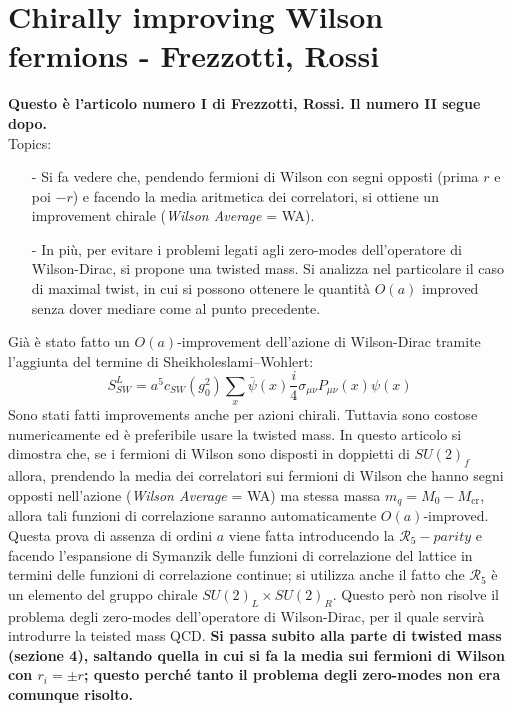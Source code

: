 \documentclass[12pt,a4paper,openright]{article}
\newcommand{\colg}{\textcolor{PineGreen}}
\newcommand{\colr}{\textcolor{BrickRed}}
\begin{document}
\section{Chirally improving Wilson fermions - Frezzotti, Rossi}
{\bf Questo è l'articolo numero I di Frezzotti, Rossi. Il numero II segue dopo.}
\\
Topics:
\begin{itemize}
  \item[-] Si fa vedere che, pendendo fermioni di Wilson con segni opposti (prima $r$ e poi $-r$) e facendo la media aritmetica dei correlatori, si ottiene un improvement chirale (\textit{Wilson Average} = WA).
  \item[-] In più, per evitare i problemi legati agli zero-modes dell'operatore di Wilson-Dirac, si propone una twisted mass. Si analizza nel particolare il caso di maximal twist, in cui si possono ottenere le quantità $O(a)$ improved senza dover mediare come al punto precedente.
\end{itemize}
Già è stato fatto un $O(a)$-improvement dell'azione di Wilson-Dirac tramite l'aggiunta del termine di Sheikholeslami–Wohlert:
\begin{equation*}
  S_{SW}^L = a^5 c_{SW}(g_0^2) \sum_{{x}} \bar\psi (x) \frac{i}{4} \sigma_{\mu\nu} P_{\mu\nu} (x)\psi (x)
\end{equation*}
Sono stati fatti improvements anche per azioni chirali. Tuttavia sono costose numericamente ed è preferibile usare la twisted mass.
\newline
In questo articolo si dimostra che, se i fermioni di Wilson sono disposti in doppietti di $SU(2)_f$ allora, prendendo la media dei correlatori sui fermioni di Wilson che hanno segni opposti nell'azione (\textit{Wilson Average} = WA) ma stessa massa $m_q = M_0 - M_{\text{cr}}$, allora tali funzioni di correlazione saranno automaticamente $O(a)$-improved.
Questa prova di assenza di ordini $a$ viene fatta introducendo la $\mathcal{R}_5-parity$ e facendo l'espansione di Symanzik delle funzioni di correlazione del lattice in termini delle funzioni di correlazione continue;
si utilizza anche il fatto che $\mathcal{R}_5$ è un elemento del gruppo chirale $SU(2)_L \times SU(2)_R$.
\newline
\colg{Questo però non risolve il problema degli zero-modes dell'operatore di Wilson-Dirac, per il quale servirà introdurre la teisted mass QCD.}
\newline \newline
\colr{\bf Si passa subito alla parte di twisted mass (sezione 4), saltando quella in cui si fa la media sui fermioni di Wilson con $r_i = \pm r$;
questo perché tanto il problema degli zero-modes non era comunque risolto.}
\end{document}
